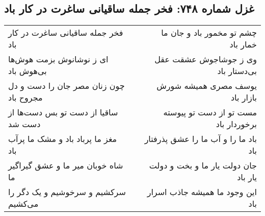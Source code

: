 \begin{center}
\section*{غزل شماره ۷۴۸: فخر جمله ساقیانی ساغرت در کار باد}
\label{sec:0748}
\begin{longtable}{l p{0.5cm} r}
فخر جمله ساقیانی ساغرت در کار باد
&&
چشم تو مخمور باد و جان ما خمار باد
\\
ای ز نوشانوش بزمت هوش‌ها بی‌هوش باد
&&
وی ز جوشاجوش عشقت عقل بی‌دستار باد
\\
چون زنان مصر جان را دست و دل مجروح باد
&&
یوسف مصری همیشه شورش بازار باد
\\
ساقیا از دست تو بس دست‌ها از دست شد
&&
مست تو از دست تو پیوسته برخوردار باد
\\
مغز ما پرباد باد و مشک ما پرآب باد
&&
باد ما را و آب ما را عشق پذرفتار باد
\\
شاه خوبان میر ما و عشق گیراگیر ما
&&
جان دولت یار ما و بخت و دولت یار باد
\\
سرکشیم و سرخوشیم و یک دگر را می‌کشیم
&&
این وجود ما همیشه جاذب اسرار باد
\\
\end{longtable}
\end{center}
